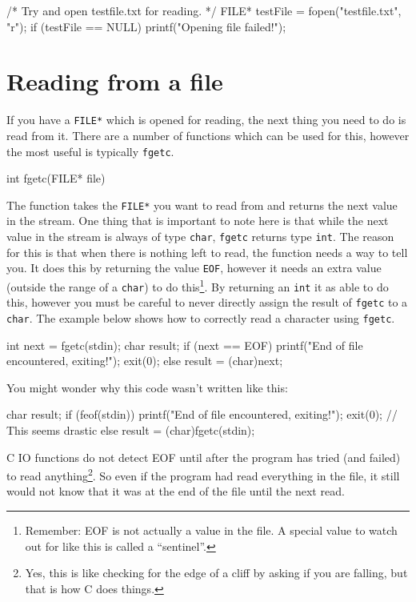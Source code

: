 \begin{codeblock}
/* Try and open testfile.txt for reading. */ 
FILE* testFile = fopen("testfile.txt", "r");
if (testFile == NULL) {
    printf("Opening file failed!\n");
}
\end{codeblock}

\section{Reading from a file}

If you have a \texttt{FILE*} which is opened for reading, the next thing you need to do is read from it.
There are a number of functions which can be used for this, however the most useful is typically \texttt{fgetc}.

\begin{codeinline}
int fgetc(FILE* file)
\end{codeinline}

The function takes the \texttt{FILE*} you want to read from and returns the next value in the stream.
One thing that is important to note here is that while the next value in the stream is always of type \texttt{char}, \texttt{fgetc} returns type \texttt{int}. 
The reason for this is that when there is nothing left to read, the function needs a way to tell you.
It does this by returning the value \texttt{EOF}, however it needs an extra value (outside the range of a \texttt{char}) to do this\footnote{Remember: EOF is not actually a
value in the file. A special value to watch out for like this is called a ``sentinel''.}.
By returning an \texttt{int} it as able to do this, however you must be careful to never directly assign the result of \texttt{fgetc} to a \texttt{char}.
The example below shows how to correctly read a character using \texttt{fgetc}.

\begin{codeblock}
int next = fgetc(stdin);
char result;
if (next == EOF) {
    printf("End of file encountered, exiting!\n");
    exit(0);
} else {
  result = (char)next;
}
\end{codeblock}

You might wonder why this code wasn't written like this:
\begin{codeblock}
char result;
if (feof(stdin)) {
    printf("End of file encountered, exiting!\n");
    exit(0);	// This seems drastic
} else {
    result = (char)fgetc(stdin);
}    
\end{codeblock}
\noindent C IO functions do not detect EOF until after the program has tried (and failed)
to read anything\footnote{Yes, this is like checking for the edge of a cliff by asking if you are falling, but that is how C does things.}.
So even if the program had read everything in the file, it still would not know that it 
was at the end of the file until the next read.


